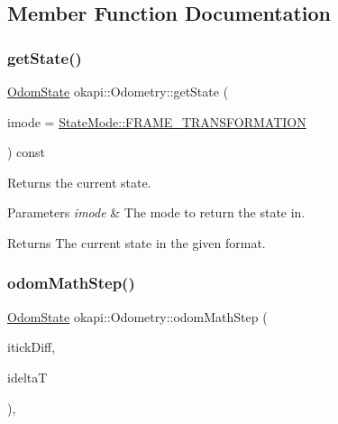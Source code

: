 \subsection{Member Function Documentation}
\mbox{\label{classokapi_1_1Odometry_a1ca6892feeeca68de3eb6faf6cf4bd18}} 
\subsubsection{\texorpdfstring{getState()}{getState()}}
{\footnotesize\ttfamily \mbox{\hyperlink{structokapi_1_1OdomState}{Odom\+State}} okapi\+::\+Odometry\+::get\+State (\begin{DoxyParamCaption}\item[{const \mbox{\hyperlink{namespaceokapi_af37fbd761bd859a00ff4dd4a87dd8c07}{State\+Mode}} \&}]{imode = {\ttfamily \mbox{\hyperlink{namespaceokapi_af37fbd761bd859a00ff4dd4a87dd8c07ad5ed7666e5cebf60d3af20a5a46edf3b}{State\+Mode\+::\+F\+R\+A\+M\+E\+\_\+\+T\+R\+A\+N\+S\+F\+O\+R\+M\+A\+T\+I\+ON}}} }\end{DoxyParamCaption}) const\hspace{0.3cm}{\ttfamily [virtual]}}

Returns the current state.


\begin{DoxyParams}{Parameters}
{\em imode} & The mode to return the state in. \\
\hline
\end{DoxyParams}
\begin{DoxyReturn}{Returns}
The current state in the given format. 
\end{DoxyReturn}
\mbox{\label{classokapi_1_1Odometry_a8fc2c3d72a0c475a7333eb9affe593a5}} 
\subsubsection{\texorpdfstring{odomMathStep()}{odomMathStep()}}
{\footnotesize\ttfamily \mbox{\hyperlink{structokapi_1_1OdomState}{Odom\+State}} okapi\+::\+Odometry\+::odom\+Math\+Step (\begin{DoxyParamCaption}\item[{const std\+::valarray$<$ std\+::int32\+\_\+t $>$ \&}]{itick\+Diff,  }\item[{const Q\+Time \&}]{ideltaT }\end{DoxyParamCaption})\hspace{0.3cm}{\ttfamily [protected]}, {\ttfamily [virtual]}}

